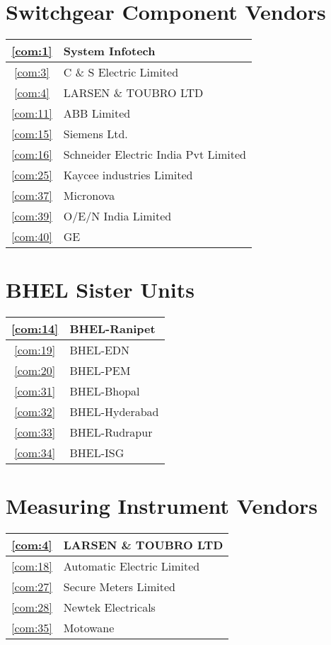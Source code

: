 \documentclass[a4paper, 11pt, twoside]{book}
\begin{document}
\section{Switchgear Component Vendors}\label{cat:2}
\begin{tabular}{|c|l|}
\hline
\ref{com:1} & System Infotech \\ \hline
\ref{com:3} & C \& S Electric Limited \\ \hline
\ref{com:4} & LARSEN \& TOUBRO LTD \\ \hline
\ref{com:11} & ABB Limited \\ \hline
\ref{com:15} & Siemens Ltd. \\ \hline
\ref{com:16} & Schneider Electric India Pvt Limited \\ \hline
\ref{com:25} & Kaycee industries Limited \\ \hline
\ref{com:37} & Micronova \\ \hline
\ref{com:39} & O/E/N India Limited \\ \hline
\ref{com:40} & GE \\ \hline
\end{tabular}
\section{BHEL Sister Units}\label{cat:3}
\begin{tabular}{|c|l|}
\hline
\ref{com:14} & BHEL-Ranipet \\ \hline
\ref{com:19} & BHEL-EDN \\ \hline
\ref{com:20} & BHEL-PEM \\ \hline
\ref{com:31} & BHEL-Bhopal \\ \hline
\ref{com:32} & BHEL-Hyderabad \\ \hline
\ref{com:33} & BHEL-Rudrapur \\ \hline
\ref{com:34} & BHEL-ISG \\ \hline
\end{tabular}
\section{Measuring Instrument Vendors}\label{cat:4}
\begin{tabular}{|c|l|}
\hline
\ref{com:4} & LARSEN \& TOUBRO LTD \\ \hline
\ref{com:18} & Automatic Electric Limited \\ \hline
\ref{com:27} & Secure Meters Limited \\ \hline
\ref{com:28} & Newtek Electricals \\ \hline
\ref{com:35} & Motowane \\ \hline
\end{tabular}
\end{document}

